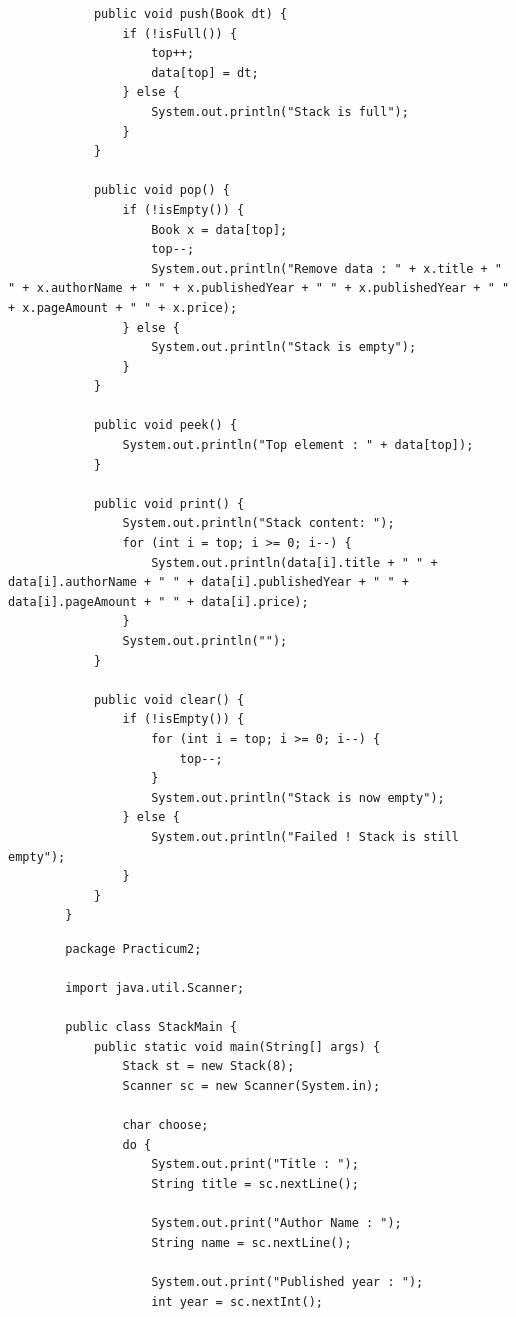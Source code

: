 \documentclass[12pt,titlepage]{article}
\begin{document}
\begin{enumerate}
\begin{verbatim}
            public void push(Book dt) {
                if (!isFull()) {
                    top++;
                    data[top] = dt;
                } else {
                    System.out.println("Stack is full");
                }
            }

            public void pop() {
                if (!isEmpty()) {
                    Book x = data[top];
                    top--;
                    System.out.println("Remove data : " + x.title + " " + x.authorName + " " + x.publishedYear + " " + x.publishedYear + " " + x.pageAmount + " " + x.price);
                } else {
                    System.out.println("Stack is empty");
                }
            }

            public void peek() {
                System.out.println("Top element : " + data[top]);
            }

            public void print() {
                System.out.println("Stack content: ");
                for (int i = top; i >= 0; i--) {
                    System.out.println(data[i].title + " " + data[i].authorName + " " + data[i].publishedYear + " " + data[i].pageAmount + " " + data[i].price);
                }
                System.out.println("");
            }

            public void clear() {
                if (!isEmpty()) {
                    for (int i = top; i >= 0; i--) {
                        top--;
                    }
                    System.out.println("Stack is now empty");
                } else {
                    System.out.println("Failed ! Stack is still empty");
                }
            }
        }
    \end{verbatim}
    \begin{verbatim}
        package Practicum2;

        import java.util.Scanner;

        public class StackMain {
            public static void main(String[] args) {
                Stack st = new Stack(8);
                Scanner sc = new Scanner(System.in);

                char choose;
                do {
                    System.out.print("Title : ");
                    String title = sc.nextLine();
                    
                    System.out.print("Author Name : ");
                    String name = sc.nextLine();

                    System.out.print("Published year : ");
                    int year = sc.nextInt();


\end{verbatim}
\end{enumerate}
\end{document}
